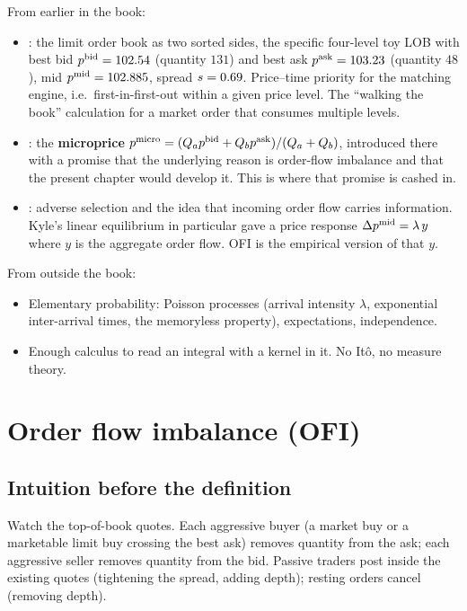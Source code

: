 \begin{backgroundbox}[Prerequisites]
From earlier in the book:
\begin{itemize}
  \item {}: the limit order book as two sorted sides,
  the specific four-level toy LOB with best bid
  $p^{\mathrm{bid}} = 102.54$ (quantity $131$) and best ask
  $p^{\mathrm{ask}} = 103.23$ (quantity $48$), mid $p^{\mathrm{mid}} = 102.885$,
  spread $s = 0.69$. Price--time priority for the matching
  engine, i.e.\ first-in-first-out within a given price level. The
  ``walking the book'' calculation for a market order that
  consumes multiple levels.
  \item {}: the \textbf{microprice}
  $p^{\mathrm{micro}} = (Q_a p^{\mathrm{bid}} + Q_b p^{\mathrm{ask}})/(Q_a + Q_b)$, introduced
  there with a promise that the underlying reason is
  order-flow imbalance and that the present chapter would
  develop it. This is where that promise is cashed in.
  \item {}: adverse selection and the idea that
  incoming order flow carries information. Kyle's linear
  equilibrium in particular gave a price response
  $\Delta p^{\mathrm{mid}} = \lambda \, y$ where $y$ is the aggregate order
  flow. OFI is the empirical version of that $y$.
\end{itemize}
From outside the book:
\begin{itemize}
  \item Elementary probability: Poisson processes (arrival
  intensity $\lambda$, exponential inter-arrival times, the
  memoryless property), expectations, independence.
  \item Enough calculus to read an integral with a kernel in it.
  No Itô, no measure theory.
\end{itemize}
\end{backgroundbox}

\section{Order flow imbalance (OFI)}
\label{sec:ofi}

\subsection{Intuition before the definition}

Watch the top-of-book quotes. Each aggressive buyer (a market
buy or a marketable limit buy crossing the best ask) removes
quantity from the ask; each aggressive seller removes quantity
from the bid. Passive traders post inside the existing quotes
(tightening the spread, adding depth); resting orders cancel
(removing depth).

